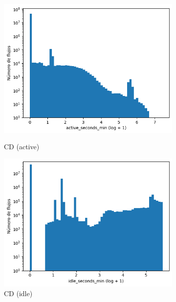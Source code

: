 \begin{figure}[H]
    \centering
    \begin{subfigure}[b]{0.26\textwidth}
        \centering
        \includegraphics[width=\textwidth]{media/packet_pincer_cicddos/active_seconds_min_log_x_log_y.png}
        \caption{CD (active)}
        \includegraphics[width=\textwidth]{media/packet_pincer_cicddos/idle_seconds_min_log_x_log_y.png}
        \caption{CD (idle)}
    \end{subfigure}
    \hfill
    \begin{subfigure}[b]{0.26\textwidth}
        \centering

\end{subfigure}
\end{figure}
